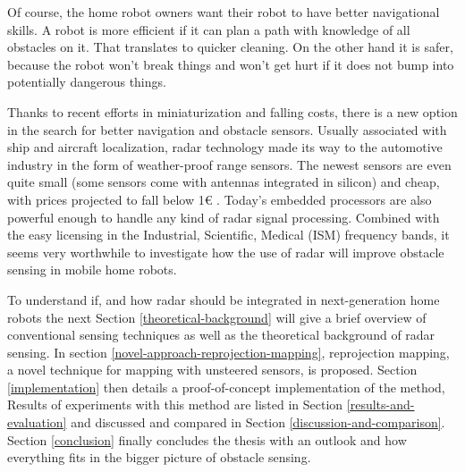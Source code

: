 Of course, the home robot owners want their robot to have better
navigational skills. A robot is more efficient if it can plan a path
with knowledge of all obstacles on it. That translates to quicker
cleaning. On the other hand it is safer, because the robot won't break
things and won't get hurt if it does not bump into potentially dangerous
things.

Thanks to recent efforts in miniaturization and falling costs, there is
a new option in the search for better navigation and obstacle sensors.
Usually associated with ship and aircraft localization, radar technology
made its way to the automotive industry in the form of weather-proof
range sensors. The newest sensors are even quite small (some sensors
come with antennas integrated in silicon) and cheap, with prices
projected to fall below 1€ \cite{Brouwer2015}. Today's embedded
processors are also powerful enough to handle any kind of radar signal
processing. Combined with the easy licensing in the Industrial,
Scientific, Medical (ISM) frequency bands, it seems very worthwhile to
investigate how the use of radar will improve obstacle sensing in mobile
home robots.

To understand if, and how radar should be integrated in next-generation
home robots the next Section \ref{theoretical-background} will give a brief overview of conventional
sensing techniques as well as the theoretical background of radar sensing. In section \ref{novel-approach-reprojection-mapping}, reprojection mapping, a novel technique for mapping with unsteered sensors, is proposed. Section \ref{implementation} then details a proof-of-concept implementation of the method, Results of experiments with this method are listed in Section \ref{results-and-evaluation} and discussed and compared in Section \ref{discussion-and-comparison}. Section \ref{conclusion} finally concludes the thesis with an outlook and how everything fits in the bigger picture of obstacle sensing.
